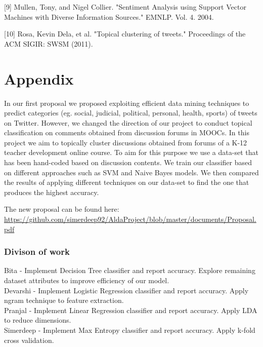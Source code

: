 \documentclass{article}
\begin{document}
[9] Mullen, Tony, and Nigel Collier. "Sentiment Analysis using Support Vector Machines with Diverse Information Sources." EMNLP. Vol. 4. 2004.

[10] Rosa, Kevin Dela, et al. "Topical clustering of tweets." Proceedings of the ACM SIGIR: SWSM (2011).

\section*{Appendix}

In our first proposal we proposed exploiting efficient data mining techniques to predict categories (eg. social, judicial, political, personal, health, sports) of tweets on Twitter. 
However, we changed the direction of our project to conduct topical classification on comments obtained from discussion forums in MOOCs. In this project we aim to topically cluster discussions obtained from forums of a K-12 teacher development online course. To aim for this purpose we use a data-set that has been hand-coded based on discussion contents. We train our classifier based on different approaches such as SVM and Naive Bayes models. We then compared the results of applying different techniques on our data-set to find the one that produces the highest accuracy.

The new proposal can be found here:
\url{https://github.com/simerdeep92/AldaProject/blob/master/documents/Proposal.pdf}

\subsubsection*{Divison of work}
Bita - Implement Decision Tree classifier and report accuracy. Explore remaining dataset attributes to improve efficiency of our model.\\
Devarshi - Implement Logistic Regression classifier and report accuracy. Apply ngram technique to feature extraction. \\
Pranjal - Implement Linear Regression classifier and report accuracy. Apply LDA to reduce dimensions.\\
Simerdeep - Implement Max Entropy classifier and report accuracy. Apply k-fold cross validation.
\end{document}
